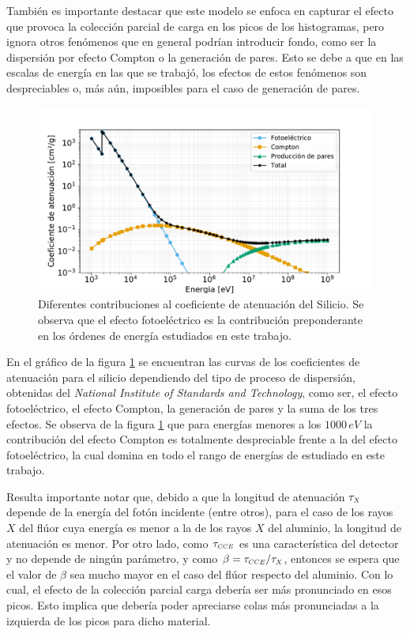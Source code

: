 También es importante destacar que este modelo se enfoca en capturar el efecto que provoca la colección parcial de carga en los picos de los histogramas, pero ignora otros fenómenos que en general podrían introducir fondo, como ser la dispersión por efecto Compton o la generación de pares. Esto se debe a que en las escalas de energía en las que se trabajó, los efectos de estos fenómenos son despreciables o, más aún, imposibles para el caso de generación de pares. 
\begin{figure}[h]
    \centering
        \includegraphics[scale=0.5]{Figs/FotoelectricoComptonPares_enSilicio.pdf}
    \caption{\footnotesize{Diferentes contribuciones al coeficiente de atenuación del Silicio. Se observa que el efecto fotoeléctrico es la contribución preponderante en los órdenes de energía estudiados en este trabajo.}}
    \label{fig:FotoelectricoComptonPares}
\end{figure}
En el gráfico de la figura \ref{fig:FotoelectricoComptonPares} se encuentran las curvas de los coeficientes de atenuación para el silicio dependiendo del tipo de proceso de dispersión, obtenidas del \textit{National Institute of Standards and Technology}\cite{FotoComptPar}, como ser, el efecto fotoeléctrico, el efecto Compton, la generación de pares y la suma de los tres efectos. Se observa de la figura \ref{fig:FotoelectricoComptonPares} que para energías menores a los $1000\,\si{eV}$ la contribución del efecto Compton es totalmente despreciable frente a la del efecto fotoeléctrico, la cual domina en todo el rango de energías de estudiado en este trabajo.

Resulta importante notar que, debido a que la longitud de atenuación $\tau_{\scaleto{X}{4pt}}$ depende de la energía del fotón incidente (entre otros), para el caso de los rayos $X$ del flúor cuya energía es menor a la de los rayos $X$ del aluminio, la longitud de atenuación es menor. Por otro lado, como $\tau_{\scaleto{CCE}{4pt}}$ es una característica del detector y no depende de ningún parámetro, y como $\beta = \tau_{\scaleto{CCE}{4pt}}/\tau_{\scaleto{X}{4pt}}$, entonces se espera que el valor de $\beta$ sea mucho mayor en el caso del flúor respecto del aluminio. Con lo cual, el efecto de la colección parcial carga debería ser más pronunciado en esos picos. Esto implica que debería poder apreciarse colas más pronunciadas a la izquierda de los picos para dicho material.

